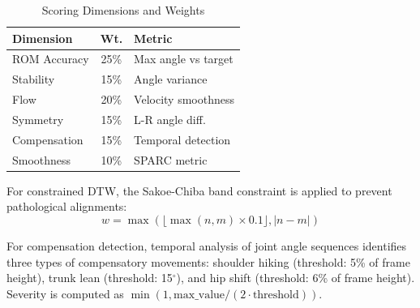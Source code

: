 \begin{table}[htbp]
    \caption{Scoring Dimensions and Weights}
    \label{tab:scoring}
    \centering
    \begin{tabular}{lcl}
        \toprule
        \textbf{Dimension} & \textbf{Wt.} & \textbf{Metric} \\
        \midrule
        ROM Accuracy & 25\% & Max angle vs target \\
        Stability & 15\% & Angle variance \\
        Flow & 20\% & Velocity smoothness \\
        Symmetry & 15\% & L-R angle diff. \\
        Compensation & 15\% & Temporal detection \\
        Smoothness & 10\% & SPARC metric \\
        \bottomrule
    \end{tabular}
\end{table}

For constrained DTW, the Sakoe-Chiba band constraint is applied to prevent pathological alignments:
\begin{equation}
    w = \max\left(\lfloor \max(n,m) \times 0.1 \rfloor, |n - m|\right)
    \label{eq:dtw_constraint}
\end{equation}


For compensation detection, temporal analysis of joint angle sequences identifies three types of compensatory movements: shoulder hiking (threshold: 5\% of frame height), trunk lean (threshold: 15$^\circ$), and hip shift (threshold: 6\% of frame height). Severity is computed as $\min(1, \text{max\_value} / (2 \cdot \text{threshold}))$.

